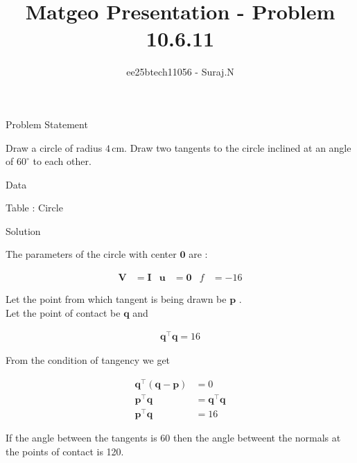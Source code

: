 \documentclass{beamer}
\title{Matgeo Presentation - Problem 10.6.11}
\author{ee25btech11056 - Suraj.N}
\numberwithin{equation}{section}
\theoremstyle{remark}
\let\vec\mathbf
\begin{document}
\begin{frame}
  \titlepage
\end{frame}

\begin{frame}{Problem Statement}

Draw a circle of radius $4\,$cm. Draw two tangents to the circle inclined at an angle of $60^\circ$ to each other.

\end{frame}

\begin{frame}{Data}

\begin{table}[h!]
  \centering
  
  \caption*{Table : Circle}
  \label{10.6.11}
\end{table}

\end{frame}

\begin{frame}{Solution}

The parameters of the circle with center $\vec{0}$ are :

\begin{align}
  \vec{V} &= \vec{I} & \vec{u} &= \vec{0} & f &= -16
\end{align}

Let the point from which tangent is being drawn be $\vec{p}$ .\\

Let the point of contact be $\vec{q}$ and 

\begin{align}
\vec{q}^\top\vec{q} = 16 
\end{align}

From the condition of tangency we get 

\begin{align}
  \vec{q}^\top(\vec{q}-\vec{p}) &= 0\\
  \vec{p}^\top\vec{q} &= \vec{q}^\top\vec{q}\\
  \vec{p}^\top\vec{q} &= 16 \label{eq:pq} 
\end{align}

If the angle between the tangents is 60{\degree} then the angle betweent the normals at the points of contact is 120{\degree}.\\


\end{frame}
\end{document}
